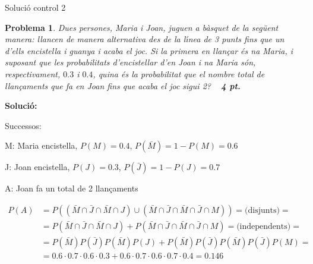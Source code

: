 \documentclass[a4paper,10pt]{article}
\newcounter{prbcont}
\newtheorem{problema}[prbcont]{Problema}
\begin{document}
\noindent
{\Large Soluci\'o control 2}

\begin{problema}
Dues persones, Maria i Joan, juguen a b\`asquet de la següent manera: llancen de manera alternativa
des de la l\'\i nea de 3 punts fins que un d'ells encistella i guanya i acaba el joc. Si la primera en llançar \'es na Maria,
i suposant que les probabilitats d'encistellar d'en Joan i na Maria s\'on, respectivament, $0.3$ i $0.4$,
quina \'es la probabilitat que el nombre total de llançaments que fa en Joan fins que acaba el joc sigui 2?
\ \hfill{\textbf{ 4 pt.}}
\end{problema}

\vspace{0.5cm}
\noindent
\textbf{Solució:}

Successos:

M: Maria encistella, $P(M)=0.4$, $P(\bar{M})=1-P(M)=0.6$

J: Joan encistella, $P(J)=0.3$, $P(\bar{J})=1-P(J)=0.7$

A: Joan fa un total de 2 llançaments

\[
\begin{array}{ll}
P(A) & =P((\bar{M} \cap \bar{J} \cap \bar{M} \cap J) \cup (\bar{M} \cap \bar{J} \cap \bar{M} \cap \bar{J} \cap M))=\text{(disjunts)}=\\
       & = P(\bar{M} \cap \bar{J} \cap \bar{M} \cap J) + P(\bar{M} \cap \bar{J} \cap \bar{M} \cap \bar{J} \cap M) = \text{(independents)}=\\
       & =  P(\bar{M}) P(\bar{J}) P(\bar{M}) P(J) + P(\bar{M}) P(\bar{J}) P(\bar{M}) P(\bar{J}) P(M)= \\
       & = 0.6 \cdot  0.7 \cdot 0.6 \cdot 0.3 +  0.6 \cdot  0.7 \cdot 0.6 \cdot 0.7 \cdot 0.4 = 0.146
\end{array}
\]
\end{document}
